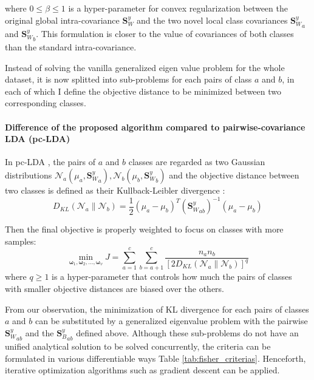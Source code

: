     where $0\le\beta\le1$ is a hyper-parameter for convex regularization between the original global intra-covariance ${\boldsymbol{S}_W^y}$ and the two novel local class covariances ${\boldsymbol{S}_W^y}_a$ and ${\boldsymbol{S}_W^y}_b$.
    This formulation is closer to the value of covariances of both classes than the standard intra-covariance.

    Instead of solving the vanilla generalized eigen value problem for the whole dataset, it is now splitted into sub-problems for each pairs of class $a$ and $b$, in each of which I define the objective distance to be minimized between two corresponding classes.

    \paragraph{Difference of the proposed algorithm compared to pairwise-covariance LDA (pc-LDA)}
        In pc-LDA \cite{kong2014pairwise}, the pairs of $a$ and $b$ classes are regarded as two Gaussian distributions $\mathcal{N}_a(\mu_a,{\boldsymbol{S}_W^y}_a), \mathcal{N}_b(\mu_b,{\boldsymbol{S}_W^y}_b)$ and the objective distance between two classes is defined as their Kullback-Leibler divergence \cite{kullback1951}:
        \begin{equation}
            D_{KL}\left(\mathcal{N}_a\parallel\mathcal{N}_b\right)=\frac{1}{2}\left(\mu_a-\mu_b\right)^{T}{\left({\boldsymbol{S}_W^y}_{ab}\right)}^{-1}\left(\mu_a-\mu_b\right)
        \end{equation}

        Then the final objective is properly weighted to focus on classes with more samples:
        \begin{equation}
            \operatorname*{min}_{\boldsymbol{\omega}_1, \boldsymbol{\omega}_2,...,
            \boldsymbol{\omega}_v}{J}=\sum_{a=1}^{c}\sum_{b=a+1}^{c}{\frac{n_an_b}{{[2D_{KL}\left(\mathcal{N}_a\parallel\mathcal{N}_b\right)]}^q}}
            \label{eq:pc-LDA}
        \end{equation}
        where $q\ge1$ is a hyper-parameter that controls how much the pairs of classes with smaller objective distances are biased over the others.

        From our observation, the minimization of KL divergence for each pairs of classes $a$ and $b$ can be substituted by a generalized eigenvalue problem with the pairwise ${\boldsymbol{S}_W^y}_{ab}$ and the ${\boldsymbol{S}_B^y}_{ab}$ defined above.
        Although these sub-problems do not have an unified analytical solution to be solved concurrently, the criteria can be formulated in various differentiable ways Table \ref{tab:fisher_criterias}.
        Henceforth, iterative optimization algorithms such as gradient descent can be applied.

